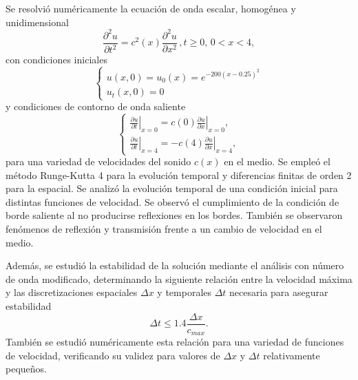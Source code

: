 \documentclass[aps,prb,twocolumn,superscriptaddress,floatfix,longbibliography,10pt]{revtex4-2}
\newcounter{para}
\begin{document}
Se resolvió numéricamente la ecuación de onda escalar, homogénea y unidimensional
\[
  \frac{\partial^2 u}{\partial t^2} = c^2(x)\frac{\partial^2 u}{\partial x^2} \,, t \geq 0, \,  0 < x < 4,
\]
con condiciones iniciales
\[
  \left\{\begin{matrix}
    u(x,0) = u_0(x) = e^{-200 (x-0.25)^2} \\
    u_t(x,0) = 0
   \end{matrix}\right.
\]
y condiciones de contorno de onda saliente
\[
  \left \{\begin{matrix}
    \left . \frac{\partial u}{\partial t} \right |_{x=0} = c(0) \left . \frac{\partial u}{\partial x} \right |_{x=0} ,\\
    \left . \frac{\partial u}{\partial t} \right |_{x=4} = - c(4) \left . \frac{\partial u}{\partial x} \right |_{x=4},
   \end{matrix}\right .
\]
para una variedad de velocidades del sonido $c(x)$ en el medio. Se empleó el método Runge-Kutta 4 para la evolución temporal y diferencias finitas de orden 2 para la espacial. Se analizó la evolución temporal de una condición inicial para distintas funciones de velocidad. Se observó el cumplimiento de la condición de borde saliente al no producirse reflexiones en los bordes. También se observaron fenómenos de reflexión y transmisión frente a un cambio de velocidad en el medio.


Además, se estudió la estabilidad de la solución mediante el análisis con número de onda modificado, determinando la siguiente relación entre la velocidad máxima y las discretizaciones espaciales $\Delta x$ y temporales $\Delta t$ necesaria para asegurar estabilidad
\[\Delta t \leq 1.4 \frac{\Delta x}{c_{max}}.\]
También se estudió numéricamente esta relación para una variedad de funciones de velocidad, verificando su validez para valores de $\Delta x$ y $\Delta t$ relativamente pequeños.


\end{document}
